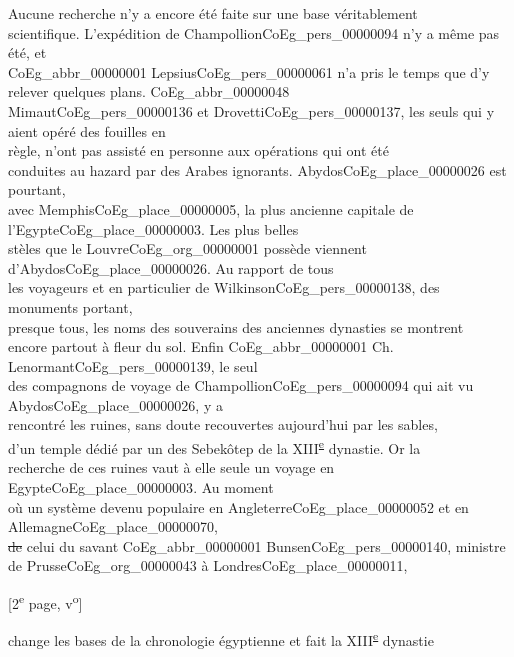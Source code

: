 \documentclass{book}
\begin{document}
Aucune recherche n’y a encore été faite sur une base véritablement\\
scientifique. L’expédition de Champollion\gls{CoEg_pers_00000094} n’y a même pas été, et\\
\gls{CoEg_abbr_00000001} Lepsius\gls{CoEg_pers_00000061} n’a pris le temps que d’y relever quelques plans. \gls{CoEg_abbr_00000048}\\
Mimaut\gls{CoEg_pers_00000136} et Drovetti\gls{CoEg_pers_00000137}, les seuls qui y aient opéré des fouilles en\\
règle, n’ont pas assisté en personne aux opérations qui ont été\\
conduites au hazard par des Arabes ignorants. Abydos\gls{CoEg_place_00000026} est pourtant,\\
avec Memphis\gls{CoEg_place_00000005}, la plus ancienne capitale de l’Egypte\gls{CoEg_place_00000003}. Les plus belles\\
stèles que le Louvre\gls{CoEg_org_00000001} possède viennent d’Abydos\gls{CoEg_place_00000026}. Au rapport de tous\\
les voyageurs et en particulier de Wilkinson\gls{CoEg_pers_00000138}, des monuments portant,\\
presque tous, les noms des souverains des anciennes dynasties se montrent\\
encore partout à fleur du sol. Enfin \gls{CoEg_abbr_00000001} Ch. Lenormant\gls{CoEg_pers_00000139}, le seul\\
des compagnons de voyage de Champollion\gls{CoEg_pers_00000094} qui ait vu Abydos\gls{CoEg_place_00000026}, y a\\
rencontré les ruines, sans doute recouvertes aujourd’hui par les sables,\\
d’un temple dédié par un des Sebekôtep de la XIII\textsuperscript{\underline{e}} dynastie. Or la\\
recherche de ces ruines vaut à elle seule un voyage en Egypte\gls{CoEg_place_00000003}. Au moment\\
où un système devenu populaire en Angleterre\gls{CoEg_place_00000052} et en Allemagne\gls{CoEg_place_00000070},\\
\sout{de} celui du savant \gls{CoEg_abbr_00000001} Bunsen\gls{CoEg_pers_00000140}, ministre de Prusse\gls{CoEg_org_00000043} à Londres\gls{CoEg_place_00000011},
{\footnotesize \begin{center} {[2\textsuperscript{e} page, v\textsuperscript{o}]}\end{center}}
\noindent change les bases de la chronologie égyptienne et fait la XIII\textsuperscript{\underline{e}} dynastie\\
\end{document}
